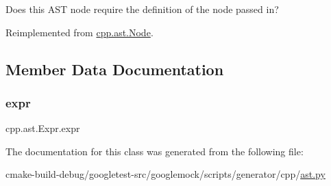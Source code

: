 \begin{DoxyVerb}Does this AST node require the definition of the node passed in?\end{DoxyVerb}
 

Reimplemented from \mbox{\hyperlink{classcpp_1_1ast_1_1Node_a31ae211f954a8c578ef16226df5ac8c8}{cpp.\+ast.\+Node}}.



\subsection{Member Data Documentation}
\mbox{\label{classcpp_1_1ast_1_1Expr_a2f4e13fb0176f2616f8703103c806462}} 
\subsubsection{\texorpdfstring{expr}{expr}}
{\footnotesize\ttfamily cpp.\+ast.\+Expr.\+expr}



The documentation for this class was generated from the following file\+:\begin{DoxyCompactItemize}
\item 
cmake-\/build-\/debug/googletest-\/src/googlemock/scripts/generator/cpp/\mbox{\hyperlink{ast_8py}{ast.\+py}}\end{DoxyCompactItemize}
